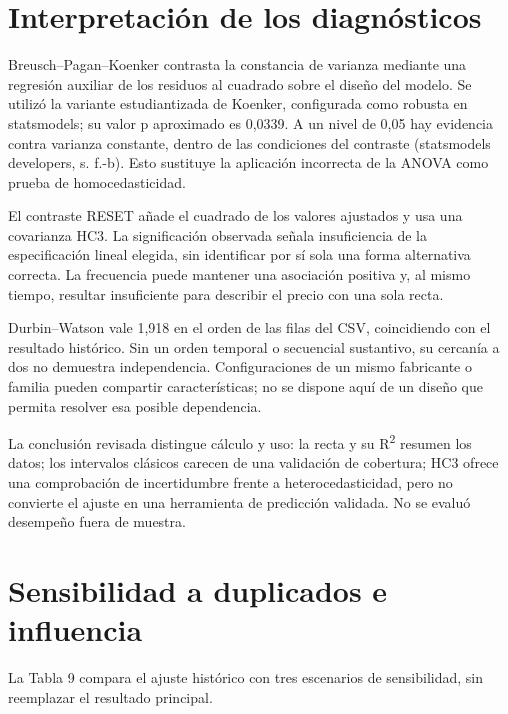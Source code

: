 \documentclass[12pt,letterpaper]{article}
\begin{document}
\clearpage
\section*{Interpretación de los diagnósticos}
Breusch–Pagan–Koenker contrasta la constancia de varianza mediante una regresión auxiliar de los residuos al cuadrado sobre el diseño del modelo. Se utilizó la variante estudiantizada de Koenker, configurada como robusta en statsmodels; su valor p aproximado es 0,0339. A un nivel de 0,05 hay evidencia contra varianza constante, dentro de las condiciones del contraste (statsmodels developers, s. f.-b). Esto sustituye la aplicación incorrecta de la ANOVA como prueba de homocedasticidad.

El contraste RESET añade el cuadrado de los valores ajustados y usa una covarianza HC3. La significación observada señala insuficiencia de la especificación lineal elegida, sin identificar por sí sola una forma alternativa correcta. La frecuencia puede mantener una asociación positiva y, al mismo tiempo, resultar insuficiente para describir el precio con una sola recta.

Durbin–Watson vale 1,918 en el orden de las filas del CSV, coincidiendo con el resultado histórico. Sin un orden temporal o secuencial sustantivo, su cercanía a dos no demuestra independencia. Configuraciones de un mismo fabricante o familia pueden compartir características; no se dispone aquí de un diseño que permita resolver esa posible dependencia.

La conclusión revisada distingue cálculo y uso: la recta y su R\textsuperscript{2} resumen los datos; los intervalos clásicos carecen de una validación de cobertura; HC3 ofrece una comprobación de incertidumbre frente a heterocedasticidad, pero no convierte el ajuste en una herramienta de predicción validada. No se evaluó desempeño fuera de muestra.

\clearpage
\section*{Sensibilidad a duplicados e influencia}
La Tabla 9 compara el ajuste histórico con tres escenarios de sensibilidad, sin reemplazar el resultado principal.
\end{document}
